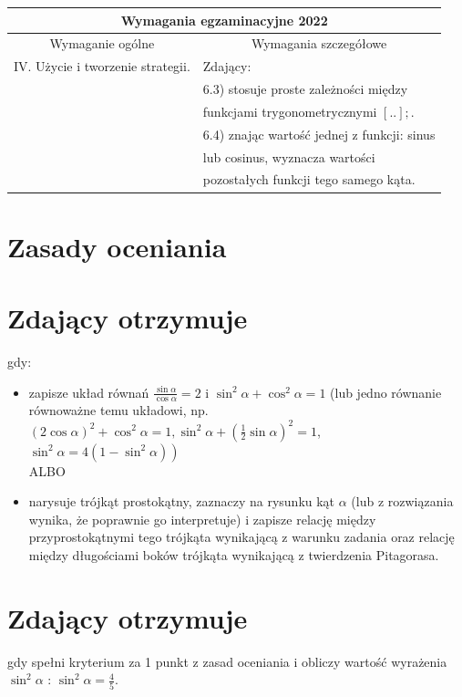 \documentclass[10pt]{article}
\begin{document}
\begin{center}
\begin{tabular}{|l|l|}
\hline
\multicolumn{2}{|c|}{Wymagania egzaminacyjne 2022} \\
\hline
\multicolumn{1}{|c|}{Wymaganie ogólne} & \multicolumn{1}{c|}{Wymagania szczegółowe} \\
\hline
IV. Użycie i tworzenie strategii. & Zdający: \\
 & 6.3) stosuje proste zależności między \\
 & funkcjami trygonometrycznymi $[. .] ;$. \\
 & 6.4) znając wartość jednej z funkcji: sinus \\
 & lub cosinus, wyznacza wartości \\
 & pozostałych funkcji tego samego kąta. \\
\hline
\end{tabular}
\end{center}

\section*{Zasady oceniania}
\section*{Zdający otrzymuje}
gdy:

\begin{itemize}
  \item zapisze układ równań $\frac{\sin \alpha}{\cos \alpha}=2$ i $\sin ^{2} \alpha+\cos ^{2} \alpha=1$ (lub jedno równanie równoważne temu układowi, np. $(2 \cos \alpha)^{2}+\cos ^{2} \alpha=1, \sin ^{2} \alpha+\left(\frac{1}{2} \sin \alpha\right)^{2}=1$, $\left.\sin ^{2} \alpha=4\left(1-\sin ^{2} \alpha\right)\right)$\\
ALBO
  \item narysuje trójkąt prostokątny, zaznaczy na rysunku kąt $\alpha$ (lub z rozwiązania wynika, że poprawnie go interpretuje) i zapisze relację między przyprostokątnymi tego trójkąta wynikającą z warunku zadania oraz relację między długościami boków trójkąta wynikającą z twierdzenia Pitagorasa.
\end{itemize}

\section*{Zdający otrzymuje}
gdy spełni kryterium za 1 punkt z zasad oceniania i obliczy wartość wyrażenia $\sin ^{2} \alpha$ : $\sin ^{2} \alpha=\frac{4}{5}$.
\end{document}
